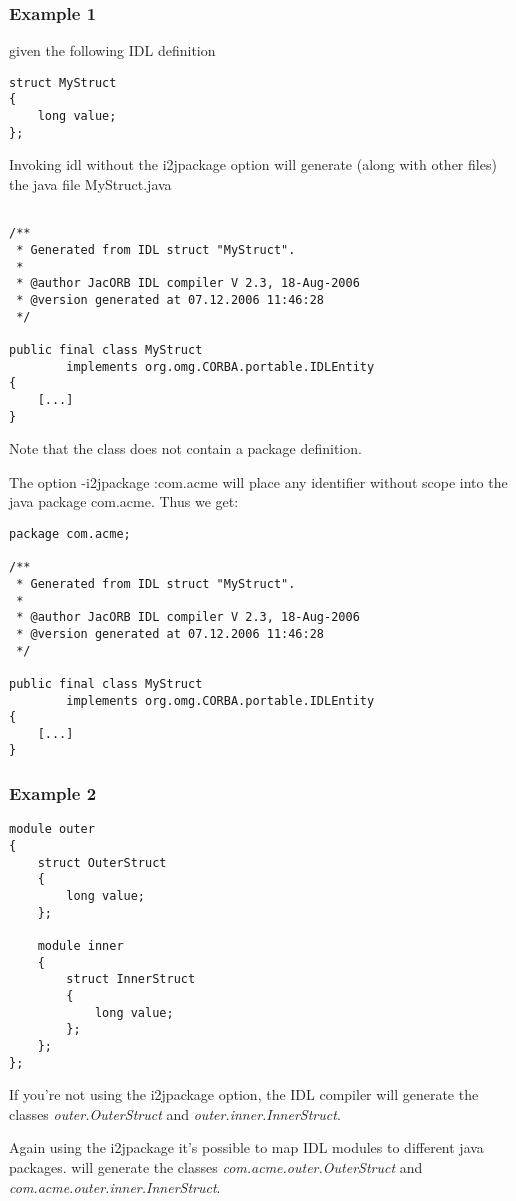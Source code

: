 \subsubsection{Example 1}

given the following IDL definition
\begin{verbatim}
struct MyStruct
{
    long value;
};
\end{verbatim}
Invoking idl without the i2jpackage option will generate (along with other
files) the java file MyStruct.java
\begin{verbatim}

/**
 * Generated from IDL struct "MyStruct".
 *
 * @author JacORB IDL compiler V 2.3, 18-Aug-2006
 * @version generated at 07.12.2006 11:46:28
 */

public final class MyStruct
        implements org.omg.CORBA.portable.IDLEntity
{
    [...]
}
\end{verbatim}

Note that the class does not contain a package definition.

The option -i2jpackage :com.acme will place any identifier without scope into
the java package com.acme. Thus we get:
\begin{verbatim}
package com.acme;

/**
 * Generated from IDL struct "MyStruct".
 *
 * @author JacORB IDL compiler V 2.3, 18-Aug-2006
 * @version generated at 07.12.2006 11:46:28
 */

public final class MyStruct
        implements org.omg.CORBA.portable.IDLEntity
{
    [...]
}
\end{verbatim}

\subsubsection{Example 2}

\begin{verbatim}
module outer
{
    struct OuterStruct
    {
        long value;
    };

    module inner
    {
        struct InnerStruct
        {
            long value;
        };
    };
};
\end{verbatim}

If you're not using the i2jpackage option, the IDL compiler will generate
the classes \emph{outer.OuterStruct} and \emph{outer.inner.InnerStruct}.

Again using the i2jpackage it's possible to map IDL modules to different java
packages.
 will generate the classes
\emph{com.acme.outer.OuterStruct} and \emph{com.acme.outer.inner.InnerStruct}.


